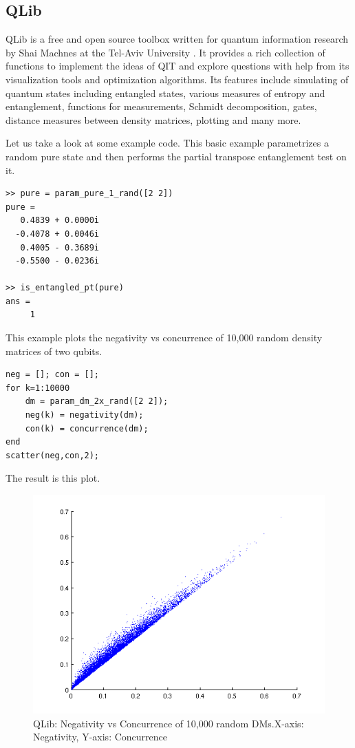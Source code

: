 \subsection{QLib}
QLib is a free and open source toolbox written for quantum information research by Shai Machnes at the Tel-Aviv University \cite{qlib}. It provides a rich collection of functions to implement the ideas of QIT and explore questions with help from its visualization tools and optimization algorithms. Its features include simulating of quantum states including entangled states, various measures of entropy and entanglement, functions for measurements, Schmidt decomposition, gates, distance measures between density matrices, plotting and many more.
\par Let us take a look at some example code. This basic example parametrizes a random pure state and then performs the partial transpose entanglement test on it.
\begin{verbatim}
>> pure = param_pure_1_rand([2 2])
pure =
   0.4839 + 0.0000i
  -0.4078 + 0.0046i
   0.4005 - 0.3689i
  -0.5500 - 0.0236i

>> is_entangled_pt(pure)
ans =
     1
\end{verbatim}
\par This example plots the negativity vs concurrence of 10,000 random density matrices of two qubits.
\begin{verbatim}
neg = []; con = [];
for k=1:10000
    dm = param_dm_2x_rand([2 2]);
    neg(k) = negativity(dm);
    con(k) = concurrence(dm);
end
scatter(neg,con,2);
\end{verbatim}
The result is this plot.
\begin{figure}[H]
    \includegraphics[scale=0.88]{figures/qlib-negativity-vs-concurrence.png}
    \caption{QLib: Negativity vs Concurrence of 10,000 random DMs.\newline X-axis: Negativity, Y-axis: Concurrence}
    \label{fig: QLib: Negativity vs Concurrence}
\end{figure}

